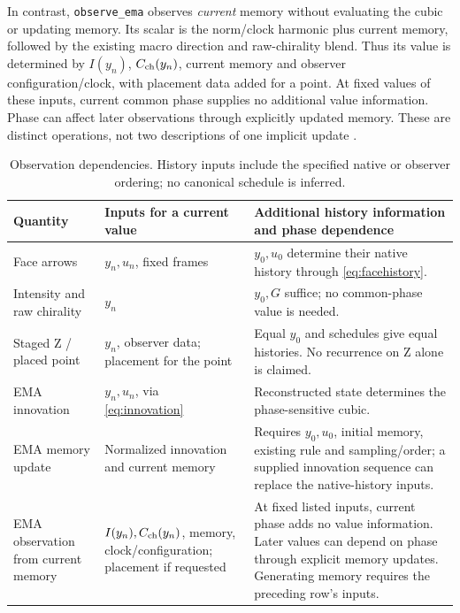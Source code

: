 In contrast, \texttt{observe\_ema} observes \emph{current} memory without evaluating the cubic or updating memory. Its scalar is the norm/clock harmonic plus current memory, followed by the existing macro direction and raw-chirality blend. Thus its value is determined by \(I(y_n)\), \(C_{\rm ch}(y_n)\), current memory and observer configuration/clock, with placement data added for a point. At fixed values of these inputs, current common phase supplies no additional value information. Phase can affect later observations through explicitly updated memory. These are distinct operations, not two descriptions of one implicit update \cite[Section 8]{zmethods}\cite{zcode}.

\begin{table}[htbp]\centering\small
\caption{Observation dependencies. History inputs include the specified native or observer ordering; no canonical schedule is inferred.}\label{tab:dependencies}
\renewcommand{\arraystretch}{1.12}
\begin{tabularx}{\textwidth}{@{}>{\raggedright\arraybackslash}p{30mm}YY@{}}\toprule
Quantity & Inputs for a current value & Additional history information and phase dependence\\\midrule
Face arrows & \(y_n,u_n\), fixed frames & \(y_0,u_0\) determine their native history through \eqref{eq:facehistory}.\\
Intensity and raw chirality & \(y_n\) & \(y_0,G\) suffice; no common-phase value is needed.\\
Staged Z / placed point & \(y_n\), observer data; placement for the point & Equal \(y_0\) and schedules give equal histories. No recurrence on Z alone is claimed.\\
EMA innovation & \(y_n,u_n\), via \eqref{eq:innovation} & Reconstructed state determines the phase-sensitive cubic.\\
EMA memory update & Normalized innovation and current memory & Requires \(y_0,u_0\), initial memory, existing rule and sampling/order; a supplied innovation sequence can replace the native-history inputs.\\
EMA observation from current memory & \(I(y_n),C_{\rm ch}(y_n)\), memory, clock/configuration; placement if requested & At fixed listed inputs, current phase adds no value information. Later values can depend on phase through explicit memory updates. Generating memory requires the preceding row's inputs.\\\bottomrule
\end{tabularx}
\end{table}

